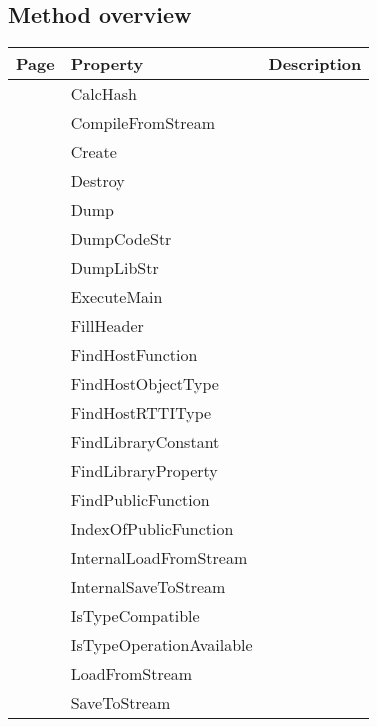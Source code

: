 \subsection{Method overview}
\label{thoriumcore:thorium:tthoriummodule:methods}
\begin{tabularx}{\textwidth}{llX}
Page & Property & Description  \\ \hline
\pageref{thoriumcore:thorium:tthoriummodule:calchash} & CalcHash  &  \\
\pageref{thoriumcore:thorium:tthoriummodule:compilefromstream} & CompileFromStream  &  \\
\pageref{thoriumcore:thorium:tthoriummodule:create} & Create  &  \\
\pageref{thoriumcore:thorium:tthoriummodule:destroy} & Destroy  &  \\
\pageref{thoriumcore:thorium:tthoriummodule:dump} & Dump  &  \\
\pageref{thoriumcore:thorium:tthoriummodule:dumpcodestr} & DumpCodeStr  &  \\
\pageref{thoriumcore:thorium:tthoriummodule:dumplibstr} & DumpLibStr  &  \\
\pageref{thoriumcore:thorium:tthoriummodule:executemain} & ExecuteMain  &  \\
\pageref{thoriumcore:thorium:tthoriummodule:fillheader} & FillHeader  &  \\
\pageref{thoriumcore:thorium:tthoriummodule:findhostfunction} & FindHostFunction  &  \\
\pageref{thoriumcore:thorium:tthoriummodule:findhostobjecttype} & FindHostObjectType  &  \\
\pageref{thoriumcore:thorium:tthoriummodule:findhostrttitype} & FindHostRTTIType  &  \\
\pageref{thoriumcore:thorium:tthoriummodule:findlibraryconstant} & FindLibraryConstant  &  \\
\pageref{thoriumcore:thorium:tthoriummodule:findlibraryproperty} & FindLibraryProperty  &  \\
\pageref{thoriumcore:thorium:tthoriummodule:findpublicfunction} & FindPublicFunction  &  \\
\pageref{thoriumcore:thorium:tthoriummodule:indexofpublicfunction} & IndexOfPublicFunction  &  \\
\pageref{thoriumcore:thorium:tthoriummodule:internalloadfromstream} & InternalLoadFromStream  &  \\
\pageref{thoriumcore:thorium:tthoriummodule:internalsavetostream} & InternalSaveToStream  &  \\
\pageref{thoriumcore:thorium:tthoriummodule:istypecompatible} & IsTypeCompatible  &  \\
\pageref{thoriumcore:thorium:tthoriummodule:istypeoperationavailable} & IsTypeOperationAvailable  &  \\
\pageref{thoriumcore:thorium:tthoriummodule:loadfromstream} & LoadFromStream  &  \\
\pageref{thoriumcore:thorium:tthoriummodule:savetostream} & SaveToStream  &  \\
\hline
\end{tabularx}
